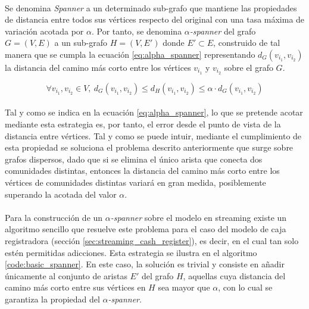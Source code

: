 \documentclass{subfiles}
\begin{document}
        \paragraph{}
        Se denomina \emph{Spanner} a un determinado sub-grafo que mantiene las propiedades de distancia entre todos sus vértices respecto del original con una tasa máxima de variación acotada por $\alpha$. Por tanto, se denomina \emph{$\alpha$-spanner} del grafo $G = (V, E)$ a un sub-grafo $H = (V, E')$ donde $E' \subset E$, construido de tal manera que se cumpla la ecuación \eqref{eq:alpha_spanner} representando $d_G(v_{i_1},v_{i_2})$ la distancia del camino más corto entre los vértices $v_{i_1}$ y $v_{i_2}$ sobre el grafo $G$.

        \begin{equation}
        \label{eq:alpha_spanner}
          \forall v_{i_1}, v_{i_2} \in V, \ d_G(v_{i_1},v_{i_2}) \leq d_H(v_{i_1},v_{i_2}) \leq \alpha \cdot d_G(v_{i_1},v_{i_2})
        \end{equation}

        \paragraph{}
        Tal y como se indica en la ecuación \eqref{eq:alpha_spanner}, lo que se pretende acotar mediante esta estrategia es, por tanto, el error desde el punto de vista de la distancia entre vértices. Tal y como se puede intuir, mediante el cumplimiento de esta propiedad se soluciona el problema descrito anteriormente que surge sobre grafos dispersos, dado que si se elimina el único arista que conecta dos comunidades distintas, entonces la distancia del camino más corto entre los vértices de comunidades distintas variará en gran medida, posiblemente superando la acotada del valor $\alpha$.

        \paragraph{}
        Para la construcción de un \emph{$\alpha$-spanner} sobre el modelo en streaming existe un algoritmo sencillo que resuelve este problema para el caso del modelo de caja registradora (sección \ref{sec:streaming_cash_register}), es decir, en el cual tan solo estén permitidas adicciones. Esta estrategia se ilustra en el algoritmo \ref{code:basic_spanner}. En este caso, la solución es trivial y consiste en añadir únicamente al conjunto de aristas $E'$ del grafo $H$, aquellas cuya distancia del camino más corto entre sus vértices en $H$ sea mayor que $\alpha$, con lo cual se garantiza la propiedad del \emph{$\alpha$-spanner}.
\end{document}
